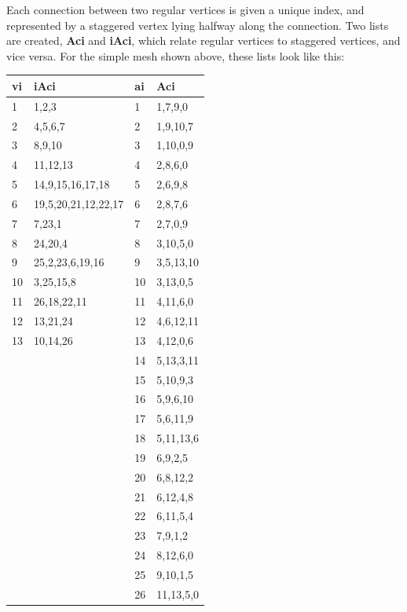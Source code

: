 \documentclass{article}
\begin{document}
Each connection between two regular vertices is given a unique index, and represented by a staggered vertex lying halfway along the connection. Two lists are created, \textbf{Aci} and \textbf{iAci}, which relate regular vertices to staggered vertices, and vice versa. For the simple mesh shown above, these lists look like this:

\begin{table}[H] \label{tab:table_Acmesh}
  \begin{center}
    \begin{tabular}{l|l|l|l}
      \textbf{vi} & \textbf{iAci} & \textbf{ai} & \textbf{Aci}\\
      \hline
      1 & 1,2,3 & 1 & 1,7,9,0\\
      2 & 4,5,6,7 & 2 & 1,9,10,7\\
      3 & 8,9,10 & 3 & 1,10,0,9\\
      4 & 11,12,13 & 4 & 2,8,6,0\\
      5 & 14,9,15,16,17,18 & 5 & 2,6,9,8\\
      6 & 19,5,20,21,12,22,17 & 6 & 2,8,7,6\\
      7 & 7,23,1 & 7 & 2,7,0,9\\
      8 & 24,20,4 & 8 & 3,10,5,0\\
      9 & 25,2,23,6,19,16 & 9 & 3,5,13,10\\
      10 & 3,25,15,8 & 10 & 3,13,0,5\\
      11 & 26,18,22,11 & 11 & 4,11,6,0\\
      12 & 13,21,24 & 12 & 4,6,12,11\\
      13 & 10,14,26 & 13 & 4,12,0,6\\
      & & 14 & 5,13,3,11\\
      & & 15 & 5,10,9,3\\
      & & 16 & 5,9,6,10\\
      & & 17 & 5,6,11,9\\
      & & 18 & 5,11,13,6\\
      & & 19 & 6,9,2,5\\
      & & 20 & 6,8,12,2\\
      & & 21 & 6,12,4,8\\
      & & 22 & 6,11,5,4\\
      & & 23 & 7,9,1,2\\
      & & 24 & 8,12,6,0\\
      & & 25 & 9,10,1,5\\
      & & 26 & 11,13,5,0
    \end{tabular}
  \end{center}
\end{table}
\end{document}
